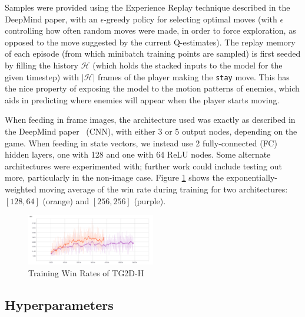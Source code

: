 \documentclass[9pt,journal]{IEEEtran}
\begin{document}
Samples were provided using the Experience Replay technique described in the DeepMind paper, with an $\epsilon$-greedy policy for selecting optimal moves (with $\epsilon$ controlling how often random moves were made, in order to force exploration, as opposed to the move suggested by the current Q-estimates). The replay memory of each episode (from which minibatch training points are sampled) is first seeded by filling the history $\mathcal{H}$ (which holds the stacked inputs to the model for the given timestep) with $|\mathcal{H}|$ frames of the player making the \texttt{stay} move. This has the nice property of exposing the model to the motion patterns of enemies, which aids in predicting where enemies will appear when the player starts moving.


When feeding in frame images, the architecture used was exactly as described in the DeepMind paper~\cite{deepmind} (CNN), with either 3 or 5 output nodes, depending on the game. When feeding in state vectors, we instead use 2 fully-connected (FC) hidden layers, one with 128 and one with 64 ReLU nodes. Some alternate architectures were experimented with; further work could include testing out more, particularly in the non-image case. Figure \ref{fig:trainingwinrate} shows the exponentially-weighted moving average of the win rate during training for two architectures: $[128, 64]$ (orange) and $[256, 256]$ (purple).

\begin{figure}[ht]
  \includegraphics[width=0.5\textwidth]{report/TG2D-H_training_winrate}
  \centering
  \caption{Training Win Rates of TG2D-H}
  \label{fig:trainingwinrate}
\end{figure}

\subsection{Hyperparameters}
\end{document}
